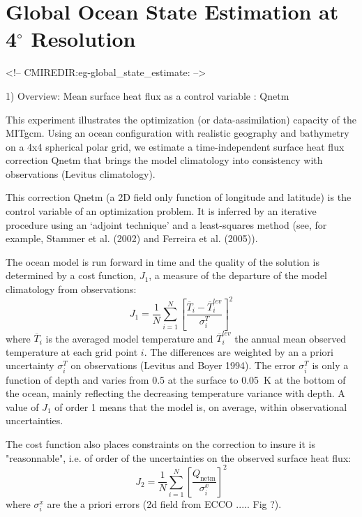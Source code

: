 
\section[Global Ocean State Estimation Example]{Global Ocean State Estimation at 4$^\circ$ Resolution}
\label{www:tutorials}
\label{sect:eg-global_state_estimate}
\begin{rawhtml}
<!-- CMIREDIR:eg-global_state_estimate: -->
\end{rawhtml}

1) Overview: Mean surface heat flux as a control variable : Qnetm

This experiment illustrates the optimization (or data-assimilation) capacity
of the MITgcm. Using an ocean configuration with realistic geography and bathymetry on a
4x4 spherical polar grid, we estimate a time-independent surface heat flux correction
Qnetm that brings the model climatology into consistency with observations (Levitus
climatology).

This correction Qnetm (a 2D field only function of longitude and latitude) is
the control variable of an optimization problem. It is inferred by an iterative
procedure using an `adjoint technique' and a least-squares method (see, for example, 
Stammer et al. (2002) and Ferreira et al. (2005)).

The ocean model is run forward in time and the quality of the solution is
determined by a cost function, $J_1$, a measure of the departure of the model
climatology from observations:
\begin{equation}
J_1=\frac{1}{N}\sum_{i=1}^N \left[ \frac{\overline{T}_i-\overline{T}_i^{lev}}{\sigma_i^T}\right]^2
\end{equation}
where $\overline{T}_i$ is the averaged model temperature and $\overline{T}_i^{lev}$
the annual mean observed temperature at each grid point $i$. The differences
are weighted by an a priori uncertainty $\sigma_i^T$ on observations (Levitus
and Boyer 1994). The error $\sigma_i^T$ is only a function of depth and varies
from 0.5 at the surface to 0.05~K at the bottom of the ocean, mainly reflecting
the decreasing temperature variance with depth. A value of $J_1$ of order 1 means
that the model is, on average, within observational uncertainties.

The cost function also places constraints on the correction to insure it is
"reasonnable", i.e. of order of the uncertainties on the observed surface heat
flux: 
\begin{equation}
J_2 = \frac{1}{N} \sum_{i=1}^N \left[\frac{Q_\mathrm{netm}}{\sigma^x_i} \right]^2
\end{equation}
where $\sigma^x_i$ are the a priori errors (2d field from ECCO ..... Fig ?).

